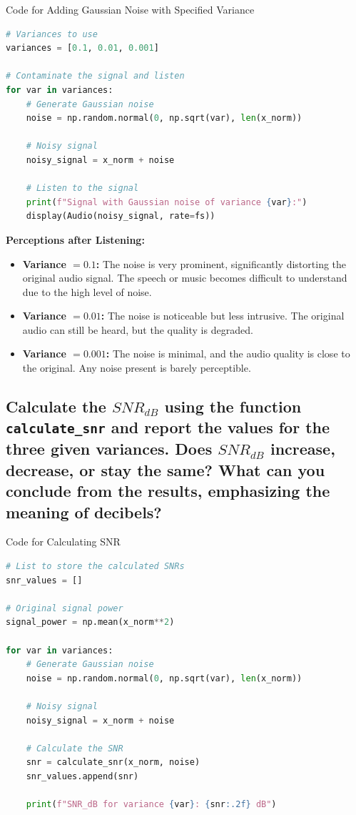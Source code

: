 \documentclass[10pt]{article}
\theoremstyle{definition}
\theoremstyle{remark}
\theoremstyle{definition}
\numberwithin{equation}{prob}
\begin{document}
Code for Adding Gaussian Noise with Specified Variance

\begin{lstlisting}[language=Python]
# Variances to use
variances = [0.1, 0.01, 0.001]

# Contaminate the signal and listen
for var in variances:
    # Generate Gaussian noise
    noise = np.random.normal(0, np.sqrt(var), len(x_norm))
    
    # Noisy signal
    noisy_signal = x_norm + noise
    
    # Listen to the signal
    print(f"Signal with Gaussian noise of variance {var}:")
    display(Audio(noisy_signal, rate=fs))
\end{lstlisting}

\textbf{Perceptions after Listening:}

\begin{itemize}
    \item \textbf{Variance \( = 0.1 \):} The noise is very prominent, significantly distorting the original audio signal. The speech or music becomes difficult to understand due to the high level of noise.
    \item \textbf{Variance \( = 0.01 \):} The noise is noticeable but less intrusive. The original audio can still be heard, but the quality is degraded.
    \item \textbf{Variance \( = 0.001 \):} The noise is minimal, and the audio quality is close to the original. Any noise present is barely perceptible.
\end{itemize}

\subsection{Calculate the \( SNR_{dB} \) using the function \texttt{calculate\_snr} and report the values for the three given variances. Does \( SNR_{dB} \) increase, decrease, or stay the same? What can you conclude from the results, emphasizing the meaning of decibels?}

Code for Calculating SNR

\begin{lstlisting}[language=Python]
# List to store the calculated SNRs
snr_values = []

# Original signal power
signal_power = np.mean(x_norm**2)

for var in variances:
    # Generate Gaussian noise
    noise = np.random.normal(0, np.sqrt(var), len(x_norm))
    
    # Noisy signal
    noisy_signal = x_norm + noise
    
    # Calculate the SNR
    snr = calculate_snr(x_norm, noise)
    snr_values.append(snr)
    
    print(f"SNR_dB for variance {var}: {snr:.2f} dB")
\end{lstlisting}
\end{document}
